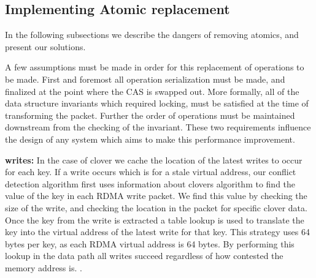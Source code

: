 
\subsection{Implementing Atomic replacement}

In the
following subsections we describe the dangers of removing atomics, and present
our solutions.

A few assumptions must be made in order for this replacement of operations to be
made. First and foremost all operation serialization must be made, and finalized
at the point where the CAS is swapped out. More formally, all of the data
structure invariants which required locking, must be satisfied at the time of
transforming the packet. Further the order of operations must be maintained
downstream from the checking of the invariant. These two requirements influence
the design of any system which aims to make this performance improvement.

\textbf{writes:} In the case of clover we cache the location of the latest writes to occur for
each key. If a write occurs which is for a stale virtual address, our conflict
detection algorithm first uses information about clovers algorithm to find the
value of the key in each RDMA write packet. We find this value by checking the
size of the write, and checking the location in the packet for specific clover
data. Once the key from the write is extracted a table lookup is used to
translate the key into the virtual address of the latest write for that key.
This strategy uses 64 bytes per key, as each RDMA virtual address is 64 bytes.
By performing this lookup in the data path all writes succeed regardless of how
contested the memory address is. .

